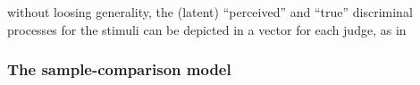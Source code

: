 \documentclass[
  authoryear,
  review,
  1p]{elsarticle}
\begin{document}
\begin{figure}


\caption{\label{fig-CJ_TM_04}}

\end{figure}%

without loosing generality, the (latent) ``perceived'' and ``true''
discriminal processes for the stimuli can be depicted in a vector for
each judge, as in

\begin{figure}


\caption{\label{fig-CJ_TM_10}}

\end{figure}%

\subsubsection{The sample-comparison
model}\label{sec-theory-theoretical_SC}
\end{document}
